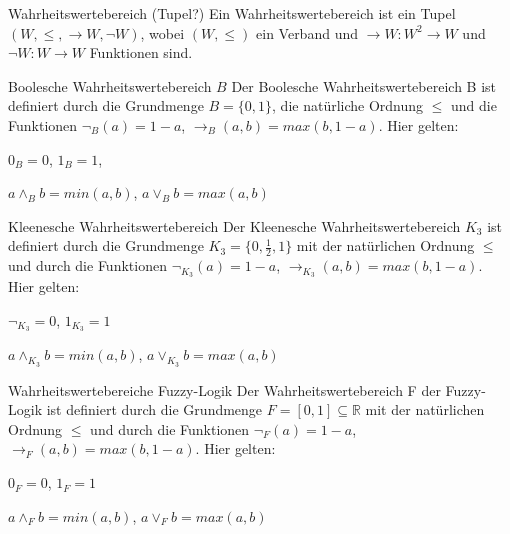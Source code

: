 \documentclass[avery5371]{flashcards}
\begin{document}
\begin{flashcard}[ Wahrheitswertebereiche ]{ Wahrheitswertebereich (Tupel?) }
    Ein Wahrheitswertebereich ist ein Tupel $(W,\leq,\rightarrow W,\lnot W)$, wobei $(W,\leq)$ ein Verband und $\rightarrow W:W^2 \rightarrow W$ und $\lnot W:W\rightarrow W$  Funktionen sind.
\end{flashcard}

\begin{flashcard}[ Wahrheitswertebereiche ]{ Boolesche Wahrheitswertebereich $B$ }
    Der Boolesche Wahrheitswertebereich B ist definiert durch die Grundmenge $B=\{0,1\}$, die natürliche Ordnung $\leq$ und die Funktionen $\lnot_B (a) = 1-a$, $\rightarrow_B(a,b) = max(b, 1 -a)$. Hier gelten:
    \begin{itemize*}
        \item $0_B=0$, $1_B= 1$,
        \item $a\wedge_B b= min(a,b)$, $a\vee_B b= max(a,b)$
    \end{itemize*}
\end{flashcard}

\begin{flashcard}[ Wahrheitswertebereiche ]{ Kleenesche Wahrheitswertebereich }
    Der Kleenesche Wahrheitswertebereich $K_3$ ist definiert durch die Grundmenge $K_3=\{0,\frac{1}{2},1\}$ mit der natürlichen Ordnung $\leq$ und durch die Funktionen $\lnot_{K_3} (a) = 1 -a $, $\rightarrow_{K_3} (a,b) = max(b, 1-a)$. Hier gelten:
    \begin{itemize*}
        \item $\lnot_{K_3} = 0$, $1_{K_3} = 1$
        \item $a\wedge_{K_3} b= min(a,b)$, $a\vee_{K_3} b= max(a,b)$
    \end{itemize*}
\end{flashcard}

\begin{flashcard}[ Wahrheitswertebereiche ]{ Wahrheitswertebereiche Fuzzy-Logik }
    Der Wahrheitswertebereich F der Fuzzy-Logik ist definiert durch die Grundmenge $F=[0,1]\subseteq\mathbb{R}$ mit der natürlichen Ordnung $\leq$ und durch die Funktionen $\lnot_F (a) = 1-a$, $\rightarrow_F (a,b) = max(b, 1-a)$. Hier gelten:
    \begin{itemize*}
        \item $0_F= 0$, $1_F= 1$
        \item $a\wedge_F b= min(a,b)$, $a\vee_F b= max(a,b)$
    \end{itemize*}
\end{flashcard}
\end{document}
